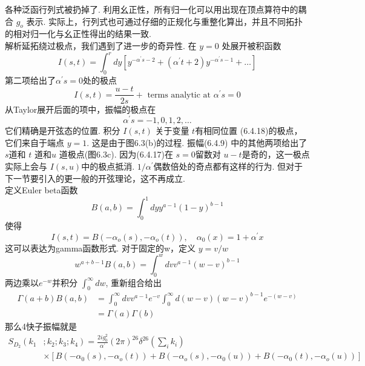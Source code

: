 各种泛函行列式被扔掉了. 利用幺正性，所有归一化可以用出现在顶点算符中的耦合 $g_{o}$ 表示. 实际上，行列式也可通过仔细的正规化与重整化算出，并且不同拓扑的相对归一化与幺正性得出的结果一致.\\
解析延拓绕过极点，我们遇到了进一步的奇异性. 在 $y=0$ 处展开被积函数
\begin{equation}
	I(s, t)=\int_{0}^{r} d y\left[y^{-\alpha^{\prime} s-2}+\left(\alpha^{\prime} t+2\right) y^{-\alpha^{\prime} s-1}+\ldots\right]
\end{equation}
第二项给出了$\alpha^{\prime} s=0$处的极点
\begin{equation}
	I(s, t)=\frac{u-t}{2 s}+\text { terms analytic at } \alpha^{\prime} s=0
\end{equation}
从Taylor展开后面的项中，振幅的极点在
\begin{equation}
	\alpha^{\prime} s=-1,0,1,2, \ldots
\end{equation}
它们精确是开弦态的位置. 积分 $I(s, t)$ 关于变量 $t$有相同位置 (6.4.18)的极点，它们来自于端点 $y=1$.  这是由于图6.3(b)的过程. 振幅(6.4.9) 中的其他两项给出了 $s$道和 $t$ 道和$u$ 道极点(图6.3c). 因为(6.4.17)在 $s=0$留数对 $u-t$是奇的，这一极点实际上会与 $I(s, u)$中的极点抵消.  $1 / \alpha^{\prime}$偶数倍处的奇点都有这样的行为. 但对于下一节要引入的更一般的开弦理论，这不再成立.\\
定义Euler beta函数
\begin{equation}
	B(a, b)=\int_{0}^{1} d y y^{a-1}(1-y)^{b-1}
\end{equation}
使得
\begin{equation}
	I(s, t)=B\left(-\alpha_{o}(s),-\alpha_{o}(t)\right), \quad \alpha_{0}(x)=1+\alpha^{\prime} x
\end{equation}
这可以表达为gamma函数形式. 对于固定的w，定义 $y=v / w$ 
\begin{equation}
	w^{a+b-1} B(a, b)=\int_{0}^{w} d v v^{a-1}(w-v)^{b-1}
\end{equation}
两边乘以$e^{-w}$并积分 $\int_{0}^{\infty} d w$, 重新组合给出
\begin{equation}
	\begin{aligned}
		\Gamma(a+b) B(a, b) &=\int_{0}^{\infty} d v v^{a-1} e^{-v} \int_{0}^{\infty} d(w-v)(w-v)^{b-1} e^{-(w-v)} \\
		&=\Gamma(a) \Gamma(b)
	\end{aligned}
\end{equation}
那么4快子振幅就是
\begin{equation}
	\begin{aligned}
		S_{D_{2}}\left(k_{1}\right.&\left.; k_{2} ; k_{3} ; k_{4}\right)=\frac{2 i g_{0}^{2}}{\alpha^{\prime}}(2 \pi)^{26} \delta^{26}\left(\sum_{i} k_{i}\right) \\
		& \times\left[B\left(-\alpha_{0}(s),-\alpha_{o}(t)\right)+B\left(-\alpha_{o}(s),-\alpha_{0}(u)\right)+B\left(-\alpha_{0}(t),-\alpha_{o}(u)\right)\right]
	\end{aligned}
\end{equation}
